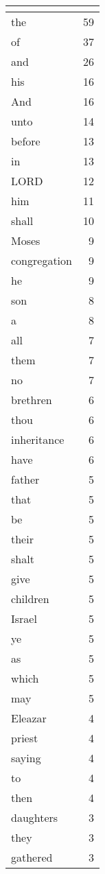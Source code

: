 \begin{center}
\begin{longtable}{l|r}
\hline \multicolumn{2}{c}{{ }} \\ \hline
\endfoot 
the & 59\\ \hline 
of & 37\\ \hline 
and & 26\\ \hline 
his & 16\\ \hline 
And & 16\\ \hline 
unto & 14\\ \hline 
before & 13\\ \hline 
in & 13\\ \hline 
LORD & 12\\ \hline 
him & 11\\ \hline 
shall & 10\\ \hline 
Moses & 9\\ \hline 
congregation & 9\\ \hline 
he & 9\\ \hline 
son & 8\\ \hline 
a & 8\\ \hline 
all & 7\\ \hline 
them & 7\\ \hline 
no & 7\\ \hline 
brethren & 6\\ \hline 
thou & 6\\ \hline 
inheritance & 6\\ \hline 
have & 6\\ \hline 
father & 5\\ \hline 
that & 5\\ \hline 
be & 5\\ \hline 
their & 5\\ \hline 
shalt & 5\\ \hline 
give & 5\\ \hline 
children & 5\\ \hline 
Israel & 5\\ \hline 
ye & 5\\ \hline 
as & 5\\ \hline 
which & 5\\ \hline 
may & 5\\ \hline 
Eleazar & 4\\ \hline 
priest & 4\\ \hline 
saying & 4\\ \hline 
to & 4\\ \hline 
then & 4\\ \hline 
daughters & 3\\ \hline 
they & 3\\ \hline 
gathered & 3\\ \hline 

\end{longtable}
\end{center}
